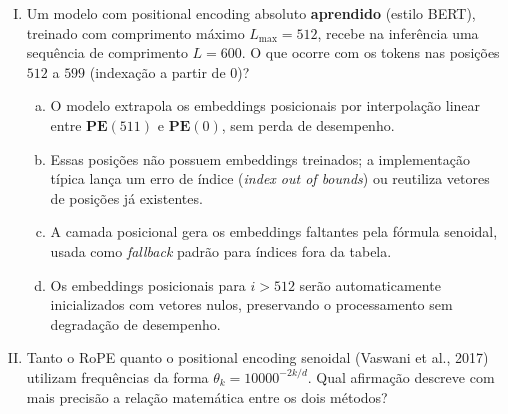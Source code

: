 \documentclass{dlproblemset}
\begin{document}
\begin{enumerate}[I)]
\begin{enumerate}[a)]
    \item Não, pois seno e cosseno são periódicas com período $2\pi$, e posições
          inteiras distintas cujos argumentos coincidem módulo $2\pi$ recebem o
          mesmo vetor.
    \item Sim, o mapeamento $i \mapsto \mathbf{PE}(i)$ é injetivo para todo inteiro
          $i \geq 0$, sem restrição de faixa.
    \item Não, pois a norma de $\mathbf{PE}(i)$ é a mesma para todo $i$, o que
          impede distinguir posições distintas.
    \item Sim, mas apenas para $i$ menor que o período da dimensão mais lenta,
          $\approx 2\pi \cdot 10000$; a partir daí o vetor se repete.
\end{enumerate}

\item {} Um modelo com positional encoding absoluto
      \textbf{aprendido} (estilo BERT), treinado com comprimento máximo $L_{\max} = 512$,
      recebe na inferência uma sequência de comprimento $L = 600$.
      O que ocorre com os tokens nas posições $512$ a $599$ (indexação a partir de $0$)?

\begin{enumerate}[a)]
    \item O modelo extrapola os embeddings posicionais por interpolação linear
          entre $\mathbf{PE}(511)$ e $\mathbf{PE}(0)$, sem perda de desempenho.
    \item Essas posições não possuem embeddings treinados; a implementação típica
          lança um erro de índice (\textit{index out of bounds}) ou reutiliza
          vetores de posições já existentes.
    \item A camada posicional gera os embeddings faltantes pela fórmula senoidal,
          usada como \textit{fallback} padrão para índices fora da tabela.
    \item Os embeddings posicionais para $i > 512$ serão automaticamente inicializados
          com vetores nulos, preservando o processamento sem degradação de desempenho.
\end{enumerate}

\item {} Tanto o RoPE quanto o positional encoding senoidal
      (Vaswani et al., 2017) utilizam frequências da forma $\theta_k = 10000^{-2k/d}$.
      Qual afirmação descreve com mais precisão a relação matemática entre os dois métodos?


\end{enumerate}
\end{document}
